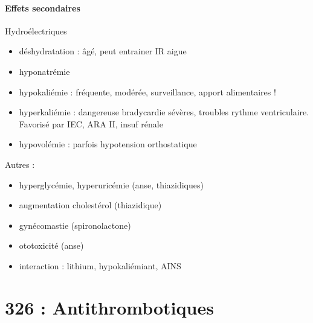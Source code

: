 \documentclass{article}
\begin{document}
\paragraph{Effets secondaires}
Hydroélectriques 
\begin{itemize}
  \item déshydratation : âgé, peut entrainer IR aigue
  \item hyponatrémie 
  \item hypokaliémie : fréquente, modérée, surveillance, apport alimentaires
    !
  \item hyperkaliémie : dangereuse \danger{} bradycardie sévères, troubles
    rythme ventriculaire. Favorisé par IEC, ARA II, insuf rénale
  \item hypovolémie : parfois hypotension orthostatique
\end{itemize}
Autres : 
\begin{itemize}
  \item hyperglycémie, hyperuricémie (anse, thiazidiques)
  \item augmentation cholestérol (thiazidique)
  \item gynécomastie (spironolactone)
  \item ototoxicité (anse)
  \item interaction : lithium, hypokaliémiant, AINS
\end{itemize}

\section{326 : Antithrombotiques}%
\label{sec:326_antithrombotiques}
\end{document}
